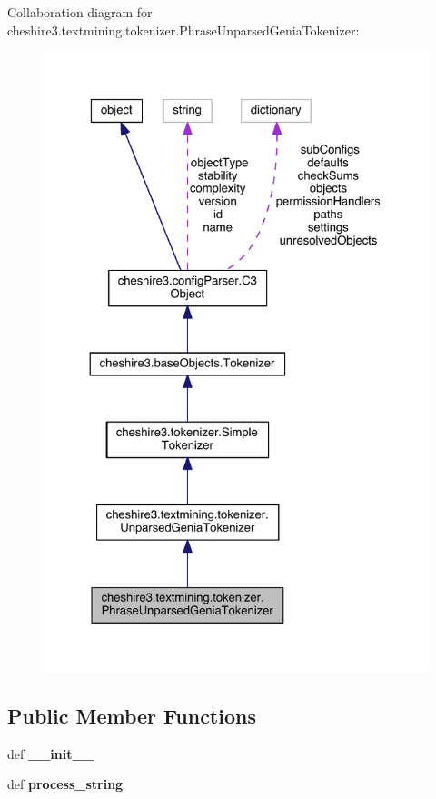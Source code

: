 Collaboration diagram for cheshire3.\-textmining.\-tokenizer.\-Phrase\-Unparsed\-Genia\-Tokenizer\-:
\nopagebreak
\begin{figure}[H]
\begin{center}
\leavevmode
\includegraphics[width=326pt]{classcheshire3_1_1textmining_1_1tokenizer_1_1_phrase_unparsed_genia_tokenizer__coll__graph}
\end{center}
\end{figure}
\subsection*{Public Member Functions}
\begin{DoxyCompactItemize}
\item 
\hypertarget{classcheshire3_1_1textmining_1_1tokenizer_1_1_phrase_unparsed_genia_tokenizer_a57312eee84d29b8dfc6ceb3d51397e78}{def {\bfseries \-\_\-\-\_\-init\-\_\-\-\_\-}}\label{classcheshire3_1_1textmining_1_1tokenizer_1_1_phrase_unparsed_genia_tokenizer_a57312eee84d29b8dfc6ceb3d51397e78}

\item 
\hypertarget{classcheshire3_1_1textmining_1_1tokenizer_1_1_phrase_unparsed_genia_tokenizer_a6bc27b2184432bad01d04f332b46ef22}{def {\bfseries process\-\_\-string}}\label{classcheshire3_1_1textmining_1_1tokenizer_1_1_phrase_unparsed_genia_tokenizer_a6bc27b2184432bad01d04f332b46ef22}

\end{DoxyCompactItemize}
